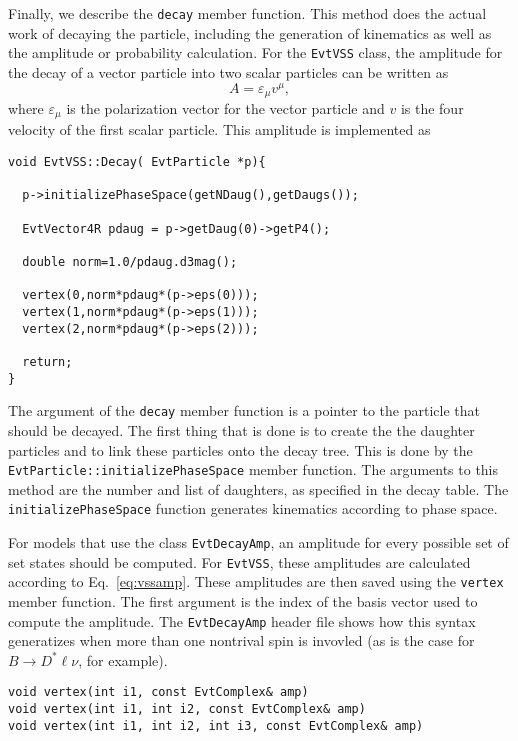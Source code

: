 Finally, we describe the {\tt decay} member function. This method
does the actual work of decaying the particle,
including the generation of kinematics as well as 
the amplitude or probability 
calculation.  For the {\tt EvtVSS} class, the amplitude for
the decay of a vector particle into two scalar particles
can be written as
\begin{equation}
A=\varepsilon_{\mu}v^{\mu},
\label{eq:vssamp}
\end{equation}
where $\varepsilon_{\mu}$ is the polarization vector for the 
vector particle and $v$ is the four velocity of the first
scalar particle.  This amplitude is implemented as

\begin{footnotesize}
\begin{verbatim}
void EvtVSS::Decay( EvtParticle *p){

  p->initializePhaseSpace(getNDaug(),getDaugs());

  EvtVector4R pdaug = p->getDaug(0)->getP4();
  
  double norm=1.0/pdaug.d3mag();

  vertex(0,norm*pdaug*(p->eps(0)));
  vertex(1,norm*pdaug*(p->eps(1)));
  vertex(2,norm*pdaug*(p->eps(2)));

  return;
}
\end{verbatim}
\end{footnotesize}

The argument of the {\tt decay}
member function is a pointer to the particle that should be
decayed. The first thing that is done is to create the
the daughter particles and to
link these particles onto the decay tree. 
This is done by the {\tt EvtParticle::initializePhaseSpace} 
member function.
The arguments to this method are the number and list of 
daughters, as specified in the decay table.
The {\tt initializePhaseSpace} function 
generates kinematics according to phase space.

For models that use the class {\tt EvtDecayAmp},
an amplitude for every possible set of set states
should be computed.  For {\tt EvtVSS}, these
amplitudes are calculated
according to Eq.~\ref{eq:vssamp}. These amplitudes are
then saved using the {\tt vertex} member
function.  The first argument is the index of the 
basis vector used to compute the amplitude.
The {\tt EvtDecayAmp} header file shows how this syntax
generatizes when more than one nontrival spin is invovled
(as is the case for $B \rightarrow D^* \ell \nu$, for example).
\begin{footnotesize}
\begin{verbatim}
void vertex(int i1, const EvtComplex& amp)
void vertex(int i1, int i2, const EvtComplex& amp)
void vertex(int i1, int i2, int i3, const EvtComplex& amp)
\end{verbatim}
\end{footnotesize}

